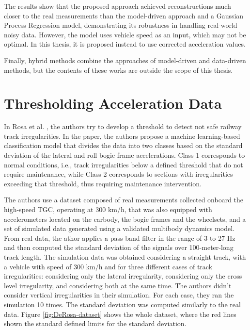 The results show that the proposed approach achieved reconstructions much closer to the real measurements than the model-driven approach and a Gaussian Process Regression model, demonstrating its robustness in handling real-world noisy data. However, the model uses vehicle speed as an input, which may not be optimal. In this thesis, it is proposed instead to use corrected acceleration values.

Finally, hybrid methods combine the approaches of model-driven and data-driven methods, but the contents of these works are outside the scope of this thesis.

\section{Thresholding Acceleration Data} \label{sec-thresholding-acceleration}

In Rosa et al. \cite{DeRosa2021}, the authors try to develop a threshold to detect not safe railway track irregularities. In the paper, the authors propose a machine learning-based classification model that divides the data into two classes based on the standard deviation of the lateral and roll bogie frame accelerations. Class 1 corresponds to normal conditions, i.e., track irregularities below a defined threshold that do not require maintenance, while Class 2 corresponds to sections with irregularities exceeding that threshold, thus requiring maintenance intervention. 

The authors use a dataset composed of real measurements collected onboard the high-speed TGC, operating at 300 km/h, that was also equipped with accelerometers located on the carbody, the bogie frames and the wheelsets, and a set of simulated data generated using a validated multibody dynamics model. From real data, the athor applies a pass-band filter in the range of 3 to 27 Hz and then computed the standard deviation of the signals over 100-meter-long track length. The simulation data was obtained considering a straight track, with a vehicle with speed of 300 km/h and for three different cases of track irregularities: considering only the lateral irregularity, considering only the cross level irregularity, and considering both at the same time. The authors didn't consider vertical irregularities in their simulation. For each case, they ran the simulation 10 times. The standard deviation was computed similarly to the real data. Figure \ref{fig:DeRosa-dataset} shows the whole dataset, where the red lines shown the standard defined limits for the standard deviation.

